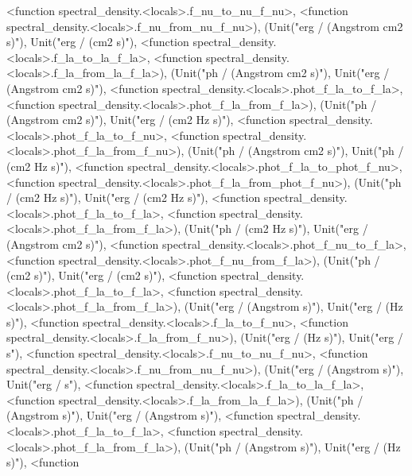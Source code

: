 \documentclass[letterpaper,10pt,english]{sphinxmanual}
\begin{document}
\begin{fulllineitems}
\textless{}function spectral\_density.\textless{}locals\textgreater{}.f\_nu\_to\_nu\_f\_nu\textgreater{}, \textless{}function spectral\_density.\textless{}locals\textgreater{}.f\_nu\_from\_nu\_f\_nu\textgreater{}), (Unit("erg / (Angstrom cm2 s)"), Unit("erg / (cm2 s)"), \textless{}function spectral\_density.\textless{}locals\textgreater{}.f\_la\_to\_la\_f\_la\textgreater{}, \textless{}function spectral\_density.\textless{}locals\textgreater{}.f\_la\_from\_la\_f\_la\textgreater{}), (Unit("ph / (Angstrom cm2 s)"), Unit("erg / (Angstrom cm2 s)"), \textless{}function spectral\_density.\textless{}locals\textgreater{}.phot\_f\_la\_to\_f\_la\textgreater{}, \textless{}function spectral\_density.\textless{}locals\textgreater{}.phot\_f\_la\_from\_f\_la\textgreater{}), (Unit("ph / (Angstrom cm2 s)"), Unit("erg / (cm2 Hz s)"), \textless{}function spectral\_density.\textless{}locals\textgreater{}.phot\_f\_la\_to\_f\_nu\textgreater{}, \textless{}function spectral\_density.\textless{}locals\textgreater{}.phot\_f\_la\_from\_f\_nu\textgreater{}), (Unit("ph / (Angstrom cm2 s)"), Unit("ph / (cm2 Hz s)"), \textless{}function spectral\_density.\textless{}locals\textgreater{}.phot\_f\_la\_to\_phot\_f\_nu\textgreater{}, \textless{}function spectral\_density.\textless{}locals\textgreater{}.phot\_f\_la\_from\_phot\_f\_nu\textgreater{}), (Unit("ph / (cm2 Hz s)"), Unit("erg / (cm2 Hz s)"), \textless{}function spectral\_density.\textless{}locals\textgreater{}.phot\_f\_la\_to\_f\_la\textgreater{}, \textless{}function spectral\_density.\textless{}locals\textgreater{}.phot\_f\_la\_from\_f\_la\textgreater{}), (Unit("ph / (cm2 Hz s)"), Unit("erg / (Angstrom cm2 s)"), \textless{}function spectral\_density.\textless{}locals\textgreater{}.phot\_f\_nu\_to\_f\_la\textgreater{}, \textless{}function spectral\_density.\textless{}locals\textgreater{}.phot\_f\_nu\_from\_f\_la\textgreater{}), (Unit("ph / (cm2 s)"), Unit("erg / (cm2 s)"), \textless{}function spectral\_density.\textless{}locals\textgreater{}.phot\_f\_la\_to\_f\_la\textgreater{}, \textless{}function spectral\_density.\textless{}locals\textgreater{}.phot\_f\_la\_from\_f\_la\textgreater{}), (Unit("erg / (Angstrom s)"), Unit("erg / (Hz s)"), \textless{}function spectral\_density.\textless{}locals\textgreater{}.f\_la\_to\_f\_nu\textgreater{}, \textless{}function spectral\_density.\textless{}locals\textgreater{}.f\_la\_from\_f\_nu\textgreater{}), (Unit("erg / (Hz s)"), Unit("erg / s"), \textless{}function spectral\_density.\textless{}locals\textgreater{}.f\_nu\_to\_nu\_f\_nu\textgreater{}, \textless{}function spectral\_density.\textless{}locals\textgreater{}.f\_nu\_from\_nu\_f\_nu\textgreater{}), (Unit("erg / (Angstrom s)"), Unit("erg / s"), \textless{}function spectral\_density.\textless{}locals\textgreater{}.f\_la\_to\_la\_f\_la\textgreater{}, \textless{}function spectral\_density.\textless{}locals\textgreater{}.f\_la\_from\_la\_f\_la\textgreater{}), (Unit("ph / (Angstrom s)"), Unit("erg / (Angstrom s)"), \textless{}function spectral\_density.\textless{}locals\textgreater{}.phot\_f\_la\_to\_f\_la\textgreater{}, \textless{}function spectral\_density.\textless{}locals\textgreater{}.phot\_f\_la\_from\_f\_la\textgreater{}), (Unit("ph / (Angstrom s)"), Unit("erg / (Hz s)"), \textless{}function 
\end{fulllineitems}
\end{document}
